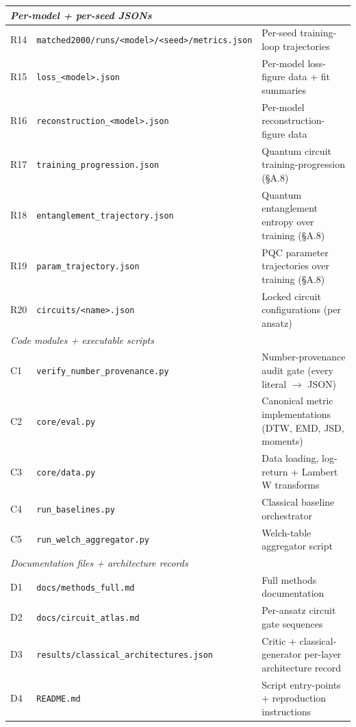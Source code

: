 \begin{table}[!htbp]
\begin{tabular}{@{}llp{6.0cm}@{}}
\midrule
\multicolumn{3}{l}{\textit{Per-model + per-seed JSONs}} \\
\midrule
R14 & \texttt{matched2000/runs/<model>/<seed>/metrics.json} & Per-seed training-loop trajectories \\
R15 & \texttt{loss\_<model>.json}             & Per-model loss-figure data + fit summaries \\
R16 & \texttt{reconstruction\_<model>.json}   & Per-model reconstruction-figure data \\
R17 & \texttt{training\_progression.json}     & Quantum circuit training-progression (\S A.8) \\
R18 & \texttt{entanglement\_trajectory.json}  & Quantum entanglement entropy over training (\S A.8) \\
R19 & \texttt{param\_trajectory.json}         & PQC parameter trajectories over training (\S A.8) \\
R20 & \texttt{circuits/<name>.json}           & Locked circuit configurations (per ansatz) \\
\midrule
\multicolumn{3}{l}{\textit{Code modules + executable scripts}} \\
\midrule
C1 & \texttt{verify\_number\_provenance.py}       & Number-provenance audit gate (every literal $\to$ JSON) \\
C2 & \texttt{core/eval.py}                        & Canonical metric implementations (DTW, EMD, JSD, moments) \\
C3 & \texttt{core/data.py}                        & Data loading, log-return + Lambert W transforms \\
C4 & \texttt{run\_baselines.py}                   & Classical baseline orchestrator \\
C5 & \texttt{run\_welch\_aggregator.py}           & Welch-table aggregator script \\
\midrule
\multicolumn{3}{l}{\textit{Documentation files + architecture records}} \\
\midrule
D1 & \texttt{docs/methods\_full.md}               & Full methods documentation \\
D2 & \texttt{docs/circuit\_atlas.md}              & Per-ansatz circuit gate sequences \\
D3 & \texttt{results/classical\_architectures.json} & Critic + classical-generator per-layer architecture record \\
D4 & \texttt{README.md}                           & Script entry-points + reproduction instructions \\
\bottomrule
\end{tabular}
\end{table}

